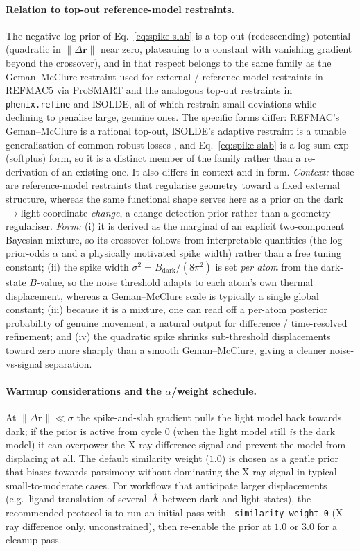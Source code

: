 \documentclass{iucrjournals}
\begin{document}
\paragraph{Relation to top-out reference-model restraints.}
The negative log-prior of Eq.~\ref{eq:spike-slab} is a top-out (redescending)
potential (quadratic in $\lVert\Delta\mathbf{r}\rVert$ near zero, plateauing to a
constant with vanishing gradient beyond the crossover), and in that respect
belongs to the same family as the Geman--McClure restraint used for
external / reference-model restraints in REFMAC5 via ProSMART
\cite{nicholls_prosmart_2014} and the analogous top-out restraints in
\texttt{phenix.refine} and ISOLDE, all of which restrain small deviations while
declining to penalise large, genuine ones. The specific forms differ: REFMAC's
Geman--McClure is a rational top-out, ISOLDE's adaptive restraint is a tunable
generalisation of common robust losses \cite{croll_read_adaptive_2021}, and
Eq.~\ref{eq:spike-slab} is a log-sum-exp (softplus) form, so it is a distinct
member of the family rather than a re-derivation of an existing one. It also
differs in context and in form. \emph{Context:} those are reference-model restraints
that regularise geometry toward a fixed external structure, whereas the same
functional shape serves here as a prior on the dark$\rightarrow$light coordinate
\emph{change}, a change-detection prior rather than a geometry regulariser.
\emph{Form:} (i) it is derived as the marginal of an explicit two-component
Bayesian mixture, so its crossover follows from interpretable quantities (the
log prior-odds $\alpha$ and a physically motivated spike width) rather than a
free tuning constant; (ii) the spike
width $\sigma^{2} = B_\mathrm{dark}/(8\pi^{2})$ is set \emph{per atom} from the
dark-state $B$-value, so the noise threshold adapts to each atom's own thermal
displacement, whereas a Geman--McClure scale is typically a single global
constant; (iii) because it is a mixture, one can read off a per-atom posterior
probability of genuine movement, a natural output for difference / time-resolved
refinement; and (iv) the quadratic spike shrinks sub-threshold displacements
toward zero more sharply than a smooth Geman--McClure, giving a cleaner
noise-vs-signal separation.

\paragraph{Warmup considerations and the $\alpha$/weight schedule.}
At $\lVert\Delta\mathbf{r}\rVert \ll \sigma$ the spike-and-slab gradient pulls the light model
back towards dark; if the prior is active from cycle 0 (when the light
model still \emph{is} the dark model) it can overpower the X-ray
difference signal and prevent the model from displacing at all.  The
default similarity weight ($1.0$) is chosen as a gentle prior that
biases towards parsimony without dominating the X-ray signal in typical
small-to-moderate cases.  For workflows that anticipate larger
displacements (e.g.\ ligand translation of several~\AA{} between dark and
light states), the recommended protocol is to run an initial pass with
\texttt{--similarity-weight\ 0} (X-ray difference only, unconstrained),
then re-enable the prior at $1.0$ or $3.0$ for a cleanup pass.
\end{document}
